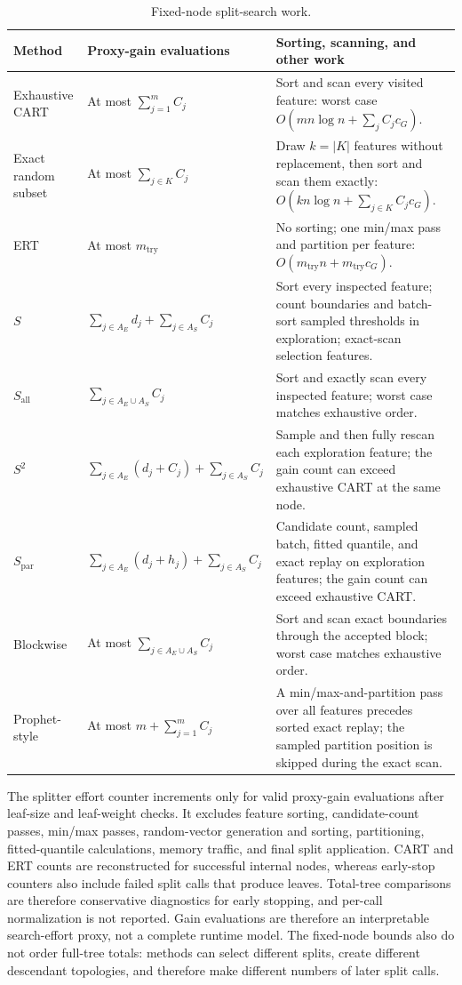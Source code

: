 \documentclass[final,5p,times,twocolumn]{elsarticle}
\begin{document}
\begin{table}[t]
\centering
\small
\caption{Fixed-node split-search work.}
\label{tab:supp_complexity}
\begin{tabular}{@{}p{}p{}p{}@{}}
\toprule
Method & Proxy-gain evaluations & Sorting, scanning, and other work \\
\midrule
Exhaustive CART & At most \(\sum_{j=1}^{m}C_j\) & Sort and scan every visited feature: worst case \(O(mn\log n+\sum_j C_jc_G)\). \\
Exact random subset & At most \(\sum_{j\in K}C_j\) & Draw \(k=|K|\) features without replacement, then sort and scan them exactly: \(O(kn\log n+\sum_{j\in K}C_jc_G)\). \\
ERT & At most \(m_{\mathrm{try}}\) & No sorting; one min/max pass and partition per feature: \(O(m_{\mathrm{try}}n+m_{\mathrm{try}}c_G)\). \\
\(S\) & \(\sum_{j\in A_E}d_j+\sum_{j\in A_S}C_j\) & Sort every inspected feature; count boundaries and batch-sort sampled thresholds in exploration; exact-scan selection features. \\
\(S_{\mathrm{all}}\) & \(\sum_{j\in A_E\cup A_S}C_j\) & Sort and exactly scan every inspected feature; worst case matches exhaustive order. \\
\(S^2\) & \(\sum_{j\in A_E}(d_j+C_j)+\sum_{j\in A_S}C_j\) & Sample and then fully rescan each exploration feature; the gain count can exceed exhaustive CART at the same node. \\
\(S_{\mathrm{par}}\) & \(\sum_{j\in A_E}(d_j+h_j)+\sum_{j\in A_S}C_j\) & Candidate count, sampled batch, fitted quantile, and exact replay on exploration features; the gain count can exceed exhaustive CART. \\
Blockwise & At most \(\sum_{j\in A_E\cup A_S}C_j\) & Sort and scan exact boundaries through the accepted block; worst case matches exhaustive order. \\
Prophet-style & At most \(m+\sum_{j=1}^{m}C_j\) & A min/max-and-partition pass over all features precedes sorted exact replay; the sampled partition position is skipped during the exact scan. \\
\bottomrule
\end{tabular}
\end{table}

The splitter effort counter increments only for valid proxy-gain evaluations
after leaf-size and leaf-weight checks.  It excludes feature sorting,
candidate-count passes, min/max passes, random-vector generation and sorting,
partitioning, fitted-quantile calculations, memory traffic, and final split
application.  CART and ERT counts are reconstructed for successful internal
nodes, whereas early-stop counters also include failed split calls that produce
leaves.  Total-tree comparisons are therefore conservative diagnostics for
early stopping, and per-call normalization is not reported.  Gain evaluations
are therefore an interpretable search-effort
proxy, not a complete runtime model.  The fixed-node bounds also do not order
full-tree totals: methods can select different splits, create different
descendant topologies, and therefore make different numbers of later split
calls.
\end{document}
